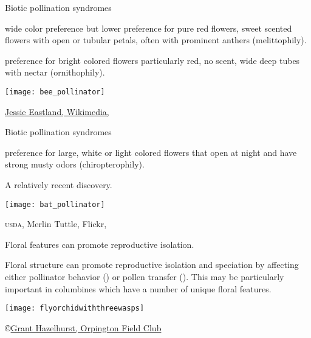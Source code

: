 \documentclass[t,hidelinks]{beamer}
\begin{document}
\begin{frame}[t]{Biotic pollination syndromes}

	\begin{multicols}{2}
	\hangpara {} wide color preference but lower preference for pure red flowers, sweet scented flowers with open or tubular petals, often with prominent anthers (melittophily).
	
	\hangpara {} preference for bright colored flowers particularly red, no scent, wide deep tubes with nectar (ornithophily).

	\columnbreak
	
		\texttt{[image: bee\_pollinator]}
	
	\end{multicols}
	
	\vfilll
	
	\hfill \tiny \href{https://commons.wikimedia.org/wiki/File:Diadasia_Bee_Straddles_Cactus_Flower_Carpels_close-up.jpg}{Jessie Eastland, Wikimedia, }
\end{frame}
%
\begin{frame}[t]{Biotic pollination syndromes}

	\begin{multicols}{2}
	\hangpara {} preference for large, white or light colored flowers that open at night and have strong musty odors (chiropterophily).
	
	\hangpara {} A relatively recent discovery.
	
	\columnbreak
	
		\texttt{[image: bat\_pollinator]}
	\end{multicols}

	\vfilll
	
	\hfill \tiny \textsc{usda}, Merlin Tuttle, Flickr, 
\end{frame}
%
\begin{frame}[t]{Floral features can promote reproductive isolation.}
	
	\begin{multicols}{2}
	\hangpara Floral structure can promote reproductive isolation and speciation by affecting either pollinator behavior () or pollen transfer (). This may be particularly important in columbines which have a number of unique floral features.  

	\columnbreak
	
		\texttt{[image: flyorchidwiththreewasps]}	
	\end{multicols}

	\vfilll
	
	\hfill \tiny \copyright \href{http://www.orpingtonfieldclub.org.uk/ofc-article002.html}{Grant Hazelhurst, Orpington Field Club}
\end{frame}
\end{document}
